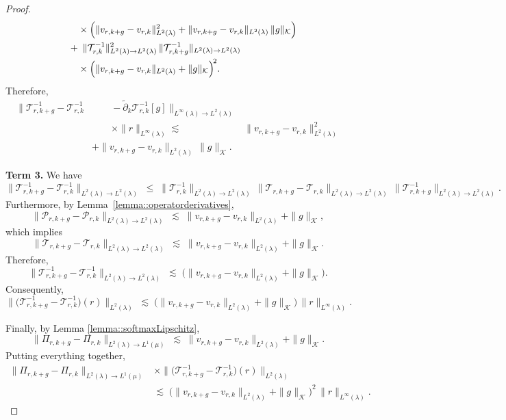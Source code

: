 \documentclass[11pt]{article}
\newcommand{\adk}{\widetilde{\partial}_k}
\theoremstyle{plain}
\begin{document}
\begin{proof}
\[\begin{aligned}
&\qquad \times \Big( \|v_{r, k+g} - v_{r,k}\|_{L^2(\lambda)}^2
+  \|v_{r,k+g} - v_{r,k}\|_{L^2(\lambda)}\,\|g\|_{\mathcal{K}} \Big) \\
&\quad +\; \|\mathcal{T}_{r,k}^{-1}\|_{L^2(\lambda) \to L^2(\lambda)}^2
   \,\|\mathcal{T}_{r,k+g}^{-1}\|_{L^2(\lambda) \to L^2(\lambda)} \notag\\
&\qquad \times
   \Big(
      \|v_{r, k+g} - v_{r,k}\|_{L^2(\lambda)}
      + \|g\|_{\mathcal{K}}
   \Big)^{\!2}.
\end{aligned}
\]
Therefore,
\[
\begin{aligned}
\big\|\mathcal{T}_{r,k+g}^{-1}-\mathcal{T}_{r,k}^{-1}
&\qquad - \adk \mathcal{T}_{r,k}^{-1}[g]\big\|_{L^\infty(\lambda) \to L^2(\lambda)} \\
&\qquad \times \|r\|_{L^\infty(\lambda)}
\lesssim\;& \|v_{r, k+g} - v_{r,k}\|_{L^2(\lambda)}^2 \\
&+  \|v_{r,k+g} - v_{r,k}\|_{L^2(\lambda)}\,\|g\|_{\mathcal{K}}.
\end{aligned}
\]

 
\noindent \textbf{Term 3.}
We have
\[
\|\mathcal{T}_{r,k+g}^{-1} - \mathcal{T}_{r,k}^{-1}\|_{L^2(\lambda) \to L^2(\lambda)}
\;\le\; \|\mathcal{T}_{r,k}^{-1}\|_{L^2(\lambda) \to L^2(\lambda)}\,
        \|\mathcal{T}_{r,k+g} - \mathcal{T}_{r,k}\|_{L^2(\lambda) \to L^2(\lambda)}\,
        \|\mathcal{T}_{r,k+g}^{-1}\|_{L^2(\lambda) \to L^2(\lambda)}.
\]
Furthermore, by Lemma~\ref{lemma::operatorderivatives},
\[
\|\mathcal{P}_{r,k+g} - \mathcal{P}_{r,k}\|_{L^2(\lambda) \to L^2(\lambda)} 
\;\lesssim\; \|v_{r,k+g} - v_{r,k}\|_{L^2(\lambda)} 
+ \|g\|_{\mathcal K},
\]
which implies
\[
\|\mathcal{T}_{r,k+g} - \mathcal{T}_{r,k}\|_{L^2(\lambda) \to L^2(\lambda)}
\;\lesssim\; \|v_{r,k+g} - v_{r,k}\|_{L^2(\lambda)} + \|g\|_{\mathcal K}.
\]
Therefore,
\[
\|\mathcal{T}_{r,k+g}^{-1} - \mathcal{T}_{r,k}^{-1}\|_{L^2(\lambda) \to L^2(\lambda)} 
\;\lesssim\; \big(\|v_{r,k+g} - v_{r,k}\|_{L^2(\lambda)} + \|g\|_{\mathcal K}\big).
\]
Consequently,
\[
\big\|\big(\mathcal{T}_{r,k+g}^{-1}-\mathcal{T}_{r,k}^{-1}\big)(r)\big\|_{L^2(\lambda)}
\;\lesssim\; \big(\|v_{r,k+g} - v_{r,k}\|_{L^2(\lambda)} + \|g\|_{\mathcal K}\big)\,
\|r\|_{L^\infty(\lambda)}.
\]

Finally, by Lemma \ref{lemma::softmaxLipschitz},
\[
\big\|\Pi_{r,k+g}-\Pi_{r,k}\big\|_{L^2(\lambda) \to L^1(\mu)} 
\;\lesssim\; \|v_{r,k+g} - v_{r,k}\|_{L^2(\lambda)} + \|g\|_{\mathcal K}.
\]
Putting everything together,
\[
\begin{aligned}
\big\|\Pi_{r,k+g}-\Pi_{r,k}\big\|_{L^2(\lambda) \to L^1(\mu)}
&\times \big\|\big(\mathcal{T}_{r,k+g}^{-1}-\mathcal{T}_{r,k}^{-1}\big)(r)\big\|_{L^2(\lambda)} \\
&\lesssim\; \big(\|v_{r,k+g} - v_{r,k}\|_{L^2(\lambda)} + \|g\|_{\mathcal K}\big)^2\,
\|r\|_{L^\infty(\lambda)}.
\end{aligned}
\]



\end{proof}
\end{document}
